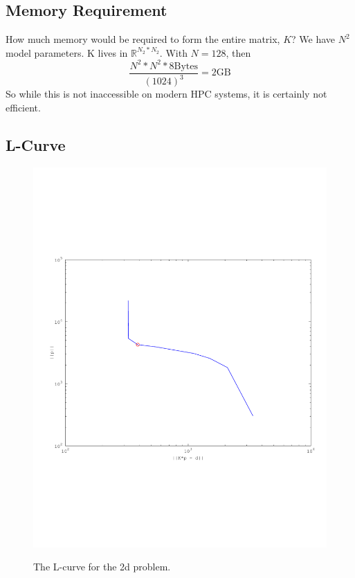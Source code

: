 \documentclass{article}
\begin{document}

\subsection{Memory Requirement}

How much memory would be required to form the entire matrix, $K$?
We have $N^2$ model parameters. K lives in $\mathbb{R}^{N_2 * N_2}$. 
With $N=128$, then 
\begin{equation}
\frac{N^2 * N^2 * 8 \text{Bytes}}{(1024)^3} = 2 \text{GB}
\end{equation}
So while this is not inaccessible on modern HPC systems, it is certainly not efficient. 

\subsection{L-Curve}

\begin{figure}[!htb]
  \includegraphics[scale=.5]{plots/L-curve2d.pdf}
  \label{fig:l2d}
  \caption{The L-curve for the 2d problem.} 
\end{figure}
\end{document}
